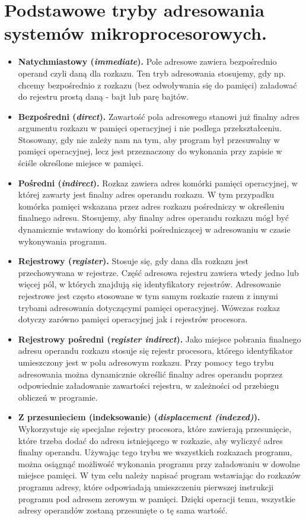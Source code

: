 \documentclass[12pt,a4paper]{article}
\begin{document}
	\section{Podstawowe tryby adresowania systemów mikroprocesorowych.}
	\begin{itemize}
		\item \textbf{Natychmiastowy (\textit{immediate}).} Pole adresowe zawiera bezpośrednio operand czyli daną dla rozkazu. Ten tryb adresowania stosujemy, gdy np. chcemy bezpośrednio z rozkazu (bez odwoływania się do pamięci) załadować do rejestru prostą daną - bajt lub parę bajtów.
		\item \textbf{Bezpośredni (\textit{direct}).} Zawartość pola adresowego stanowi już finalny adres argumentu rozkazu w pamięci operacyjnej i nie podlega przekształceniu. Stosowany, gdy nie zależy nam na tym, aby program był przesuwalny w pamięci operacyjnej, lecz jest przeznaczony do wykonania przy zapisie w ściśle określone miejsce w pamięci.
		\item \textbf{Pośredni (\textit{indirect}).} Rozkaz zawiera adres komórki pamięci operacyjnej, w której zawarty jest finalny adres operandu rozkazu. W tym przypadku komórka pamięci wskazana przez adres rozkazu pośredniczy w określeniu finalnego adresu. Stosujemy, aby finalny adres operandu rozkazu mógł być dynamicznie wstawiony do komórki pośredniczącej w adresowaniu w czasie wykonywania programu.
		\item \textbf{Rejestrowy (\textit{register}).} Stosuje się, gdy dana dla rozkazu jest przechowywana w rejestrze. Część adresowa rejestru zawiera wtedy jedno lub więcej pól, w których znajdują się identyfikatory rejestrów. Adresowanie rejestrowe jest często stosowane w tym samym rozkazie razem z innymi trybami adresowania dotyczącymi pamięci operacyjnej. Wówczas rozkaz dotyczy zarówno pamięci operacyjnej jak i rejestrów procesora.
		\item \textbf{Rejestrowy pośredni (\textit{register indirect}).} Jako miejsce pobrania finalnego adresu operandu rozkazu stosuje się rejestr procesora, którego identyfikator umieszczony jest w polu adresowym rozkazu. Przy pomocy tego trybu adresowania można dynamicznie określić finalny adres operandu poprzez odpowiednie załadowanie zawartości rejestru, w zależności od przebiegu obliczeń w programie.
		\item \textbf{Z przesunieciem (indeksowanie) (\textit{displacement (indexed)}).} Wykorzystuje się specjalne rejestry procesora, które zawierają przesunięcie, które trzeba dodać do adresu istniejącego w rozkazie, aby wyliczyć adres finalny operandu. Używając tego trybu we wszystkich rozkazach programu, można osiągnąć możliwość wykonania programu przy załadowaniu w dowolne miejsce pamięci. W tym celu należy napisać program wstawiając do rozkazów programu adresy, które odpowiadają umieszczeniu pierwszej instrukcji programu pod adresem zerowym w pamięci. Dzięki operacji temu, wszystkie adresy operandów zostaną przesunięte o tę sama wartość.
	\end{itemize}
\end{document}

